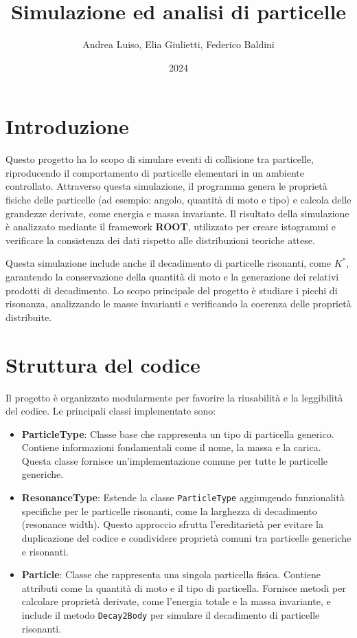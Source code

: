\documentclass[a4paper,11pt]{article}
\title{Simulazione ed analisi di particelle}
\author{Andrea Luiso, Elia Giulietti, Federico Baldini}
\date{2024}
\begin{document}
\maketitle
\newpage

\tableofcontents
\newpage

\section{Introduzione}

Questo progetto ha lo scopo di simulare eventi di collisione tra particelle, riproducendo il comportamento di particelle elementari in un ambiente controllato. Attraverso questa simulazione, il programma genera le proprietà fisiche delle particelle (ad esempio: angolo, quantità di moto e tipo) e calcola delle grandezze derivate, come energia e massa invariante. Il risultato della simulazione è analizzato mediante il framework \textbf{ROOT}, utilizzato per creare istogrammi e verificare la consistenza dei dati rispetto alle distribuzioni teoriche attese.

Questa simulazione include anche il decadimento di particelle risonanti, come \( K^* \), garantendo la conservazione della quantità di moto e la generazione dei relativi prodotti di decadimento. Lo scopo principale del progetto è studiare i picchi di risonanza, analizzando le masse invarianti e verificando la coerenza delle proprietà distribuite.

\clearpage

\section{Struttura del codice}

Il progetto è organizzato modularmente per favorire la riusabilità e la leggibilità del codice. Le principali classi implementate sono:

\begin{itemize}
    \item \textbf{ParticleType}: Classe base che rappresenta un tipo di particella generico. Contiene informazioni fondamentali come il nome, la massa e la carica. Questa classe fornisce un'implementazione comune per tutte le particelle generiche.
    \item \textbf{ResonanceType}: Estende la classe \texttt{ParticleType} aggiungendo funzionalità specifiche per le particelle risonanti, come la larghezza di decadimento (resonance width). Questo approccio sfrutta l'ereditarietà per evitare la duplicazione del codice e condividere proprietà comuni tra particelle generiche e risonanti.
    \item \textbf{Particle}: Classe che rappresenta una singola particella fisica. Contiene attributi come la quantità di moto e il tipo di particella. Fornisce metodi per calcolare proprietà derivate, come l'energia totale e la massa invariante, e include il metodo \texttt{Decay2Body} per simulare il decadimento di particelle risonanti.
\end{itemize}
\end{document}
